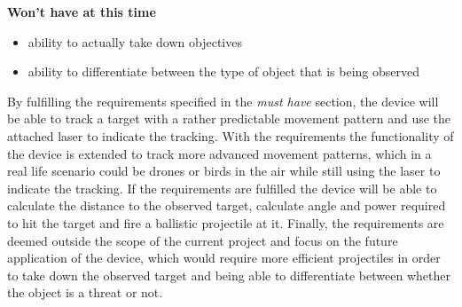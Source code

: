 \textbf{Won't have at this time}
\begin{itemize}
\item ability to actually take down objectives
\item ability to differentiate between the type of object that is being observed
\end{itemize}

By fulfilling the requirements specified in the \textit{must have} section, the device will be able to track a target with a rather predictable movement pattern and use the attached laser to indicate the tracking. 
With the  requirements the functionality of the device is extended to track more advanced movement patterns, which in a real life scenario could be drones or birds in the air while still using the laser to indicate the tracking.
If the  requirements are fulfilled the device will be able to calculate the distance to the observed target, calculate angle and power required to hit the target and fire a ballistic projectile at it.
Finally, the  requirements are deemed outside the scope of the current project and focus on the future application of the device, which would require more efficient projectiles in order to take down the observed target and being able to differentiate between whether the object is a threat or not.